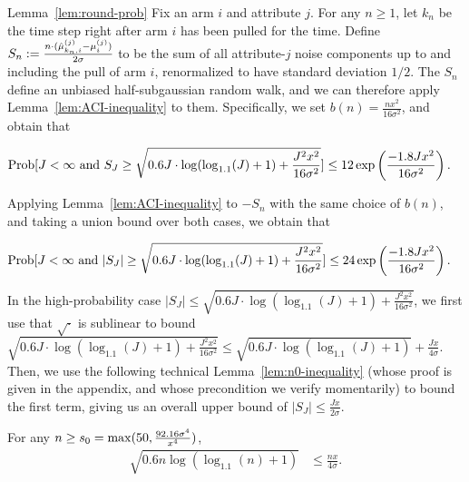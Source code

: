 \begin{extraproof}{Lemma~\ref{lem:round-prob}}
Fix an arm $i$ and attribute $j$.
For any $n \geq 1$, let $k_n$ be the time step right after arm $i$ has
been pulled for the  time.
Define
$S_n := \frac{n \cdot (\hat{\mu}_{k_n,i}^{(j)} - \mu_{i}^{(j)})}{2 \sigma}$
to be the sum of all attribute-$j$ noise components up to and
including the  pull of arm $i$,
renormalized to have standard deviation $1/2$.
The $S_n$ define an unbiased half-subgaussian random walk,
and we can therefore apply Lemma~\ref{lem:ACI-inequality} to them.
Specifically, we set $b(n) = \frac{n x^2}{16 \sigma^2}$,
and obtain that

\begin{align*}
\Prob{J < \infty \mbox{ and } S_J \geq 
\sqrt{0.6 J \cdot \log (\log_{1.1}(J) + 1) + \frac{J^2 x^2}{16 \sigma^2}}}
& \leq 12 \exp \left( \frac{-1.8 J x^2}{16 \sigma^2} \right).
\end{align*}

Applying Lemma~\ref{lem:ACI-inequality} to $-S_n$ with the same choice
of $b(n)$, and taking a union bound over both cases, we obtain that

\begin{align*}
\Prob{J < \infty \mbox{ and } |S_J| \geq 
\sqrt{0.6 J \cdot \log (\log_{1.1}(J) + 1) + \frac{J^2 x^2}{16 \sigma^2}}}
& \leq 24 \exp \left( \frac{-1.8 J x^2}{16 \sigma^2} \right).
\end{align*}

In the high-probability case
$|S_J| \leq
\sqrt{0.6 J \cdot \log (\log_{1.1}(J) + 1) + \frac{J^2 x^2}{16 \sigma^2}}$,
we first use that $\sqrt{\cdot}$ is sublinear to bound
$\sqrt{0.6 J \cdot \log (\log_{1.1}(J) + 1) + \frac{J^2 x^2}{16 \sigma^2}}
\leq \sqrt{0.6 J \cdot \log (\log_{1.1}(J) + 1)} + \frac{J x}{4 \sigma}$.
Then, we use the following technical Lemma~\ref{lem:n0-inequality}
(whose proof is given in the appendix, and whose precondition we verify
momentarily) to bound the first term,
giving us an overall upper bound of
$|S_J| \leq \frac{J x}{2 \sigma}$.

\begin{lemma} \label{lem:n0-inequality}
For any $n \geq s_0 = \max (50, \frac{92.16 \sigma^4}{x^4})$, 
\begin{align*}
\sqrt{0.6 n \log (\log_{1.1}(n) + 1)} & \leq \frac{n x}{4 \sigma}. 
\end{align*}
\end{lemma}


\end{extraproof}
